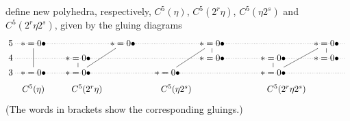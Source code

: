 \documentclass[12pt,a4paper]{amsart}
\theoremstyle{definition}
\theoremstyle{remark}
\numberwithin{equation}{section}
\begin{document}
 define new polyhedra, respectively, $C^5(\eta)$, $C^5(2^r\eta)$, $C^5(\eta2^s)$ and $C^5(2^r\eta2^s)$,
 given by the gluing diagrams
 \[
  \xymatrix@R=1ex@C=.7ex{
	 {5} \ar@{.} [rrrrrrrrr] & {*=0{\bullet}} \ar@{-} [dd] && {*=0{\bullet}} \ar@{-}[ddl] & & 
	{*=0{\bullet}} \ar@{-}[ddl]\ar@{-}[d]  &&& {*=0{\bullet}} \ar@{-}[ddl] \ar@{-}[d] & {} \\
        {4} \ar@{.} [rrrrrrrrr] && {*=0{\bullet}} \ar@{-}[d] &&& {*=0{\bullet}} 
	 && {*=0{\bullet}}\ar@{-}[d] &{*=0{\bullet}}&{} \\
        {3} \ar@{.} [rrrrrrrrr] & {*=0{\bullet}} & {*=0{\bullet}} && {*=0{\bullet}} &&& {*=0{\bullet}}&&  {} 	\\
	& {C^5(\eta)}  & {\qquad C^5(2^r\eta)} && {\qquad C^5(\eta2^s)} &&& {\qquad\quad C^5(2^r\eta 2^s)} 	}   
 \]
 (The words in brackets show the corresponding gluings.) 
 
\end{document}
